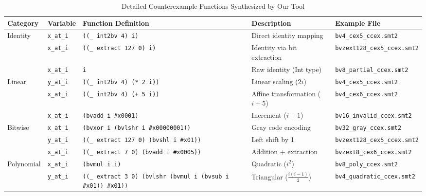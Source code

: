 \begin{table}[t]
\centering
\caption{Detailed Counterexample Functions Synthesized by Our Tool}
\label{tab:ccex_functions_detailed}
\scriptsize
\begin{tabular}{@{}lllp{6cm}l@{}}
\toprule
\textbf{Category} & \textbf{Variable} & \textbf{Function Definition} & \textbf{Description} & \textbf{Example File} \\
\midrule

\multirow{3}{*}{Identity} 
& \texttt{x\_at\_i} & \texttt{((\_ int2bv 4) i)} & Direct identity mapping & \texttt{bv4\_cex5\_ccex.smt2} \\
& \texttt{x\_at\_i} & \texttt{((\_ extract 127 0) i)} & Identity via bit extraction & \texttt{bvzext128\_cex5\_ccex.smt2} \\
& \texttt{x\_at\_i} & \texttt{i} & Raw identity (Int type) & \texttt{bv8\_partial\_ccex.smt2} \\
\midrule

\multirow{3}{*}{Linear} 
& \texttt{y\_at\_i} & \texttt{((\_ int2bv 4) (* 2 i))} & Linear scaling ($2i$) & \texttt{bv4\_cex5\_ccex.smt2} \\
& \texttt{x\_at\_i} & \texttt{((\_ int2bv 4) (+ 5 i))} & Affine transformation ($i+5$) & \texttt{bv4\_cex6\_ccex.smt2} \\
& \texttt{x\_at\_i} & \texttt{(bvadd i \#x0001)} & Increment ($i+1$) & \texttt{bv16\_invalid\_ccex.smt2} \\
\midrule

\multirow{3}{*}{Bitwise} 
& \texttt{x\_at\_i} & \texttt{(bvxor i (bvlshr i \#x00000001))} & Gray code encoding & \texttt{bv32\_gray\_ccex.smt2} \\
& \texttt{y\_at\_i} & \texttt{((\_ extract 127 0) (bvshl i \#x01))} & Left shift by 1 & \texttt{bvzext128\_cex5\_ccex.smt2} \\
& \texttt{x\_at\_i} & \texttt{((\_ extract 7 0) (bvadd i \#x0005))} & Addition + extraction & \texttt{bvzext8\_cex6\_ccex.smt2} \\
\midrule

\multirow{2}{*}{Polynomial} 
& \texttt{x\_at\_i} & \texttt{(bvmul i i)} & Quadratic ($i^2$) & \texttt{bv8\_poly\_ccex.smt2} \\
& \texttt{y\_at\_i} & \texttt{((\_ extract 3 0) (bvlshr (bvmul i (bvsub i \#x01)) \#x01))} & Triangular ($\frac{i(i-1)}{2}$) & \texttt{bv4\_quadratic\_ccex.smt2} \\
\midrule


\end{tabular}
\end{table}
